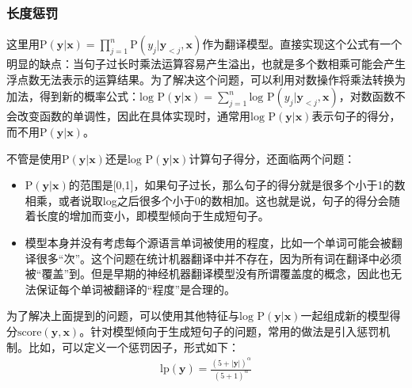 
\subsubsection{长度惩罚}

\parinterval 这里用P$(\mathbf{y} | \mathbf{x}) = \prod_{j=1}^n \textrm{P}(y_j | \mathbf{y}_{<j},\mathbf{x}) $作为翻译模型。直接实现这个公式有一个明显的缺点：当句子过长时乘法运算容易产生溢出，也就是多个数相乘可能会产生浮点数无法表示的运算结果。为了解决这个问题，可以利用对数操作将乘法转换为加法，得到新的概率公式：$\textrm{log P}(\mathbf{y} | \mathbf{x}) = \sum_{j=1}^n \textrm{log P} (y_j | \mathbf{y}_{<j}, \mathbf{x}) $，对数函数不会改变函数的单调性，因此在具体实现时，通常用$\textrm{log P}(\mathbf{y} | \mathbf{x})$表示句子的得分，而不用$\textrm{P}(\mathbf{y} | \mathbf{x})$。

\parinterval 不管是使用$\textrm{P}(\mathbf{y} | \mathbf{x})$还是$\textrm{log P}(\mathbf{y} | \mathbf{x})$计算句子得分，还面临两个问题：

\begin{itemize}
\vspace{0.5em}
\item $\textrm{P}(\mathbf{y} | \mathbf{x})$的范围是[0,1]，如果句子过长，那么句子的得分就是很多个小于1的数相乘，或者说取log之后很多个小于0的数相加。这也就是说，句子的得分会随着长度的增加而变小，即模型倾向于生成短句子。
\vspace{0.5em}
\item 模型本身并没有考虑每个源语言单词被使用的程度，比如一个单词可能会被翻译很多``次''。这个问题在统计机器翻译中并不存在，因为所有词在翻译中必须被``覆盖''到。但是早期的神经机器翻译模型没有所谓覆盖度的概念，因此也无法保证每个单词被翻译的``程度''是合理的\cite{li-etal-2018-simple,TuModeling}。
\vspace{0.5em}
\end{itemize}

\parinterval 为了解决上面提到的问题，可以使用其他特征与$\textrm{log P}(\mathbf{y} | \mathbf{x})$一起组成新的模型得分$\textrm{score} ( \mathbf{y} , \mathbf{x})$。针对模型倾向于生成短句子的问题，常用的做法是引入惩罚机制。比如，可以定义一个惩罚因子，形式如下：
\begin{eqnarray}
\textrm{lp}(\mathbf{y}) = \frac {(5+ |\mathbf{y}|)^{\alpha}} {(5+1)^{\alpha}}
\label{eq:6-39}
\end{eqnarray}

